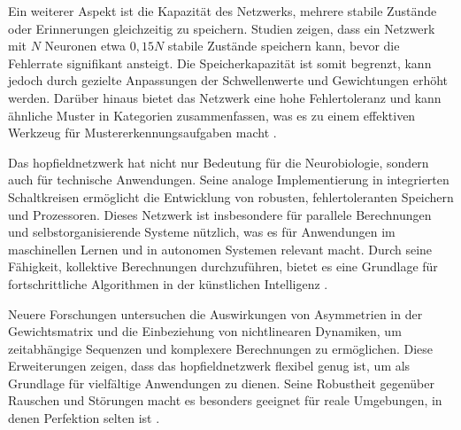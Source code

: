 Ein weiterer Aspekt ist die Kapazität des Netzwerks, mehrere stabile Zustände oder Erinnerungen gleichzeitig zu speichern. Studien zeigen, dass ein Netzwerk mit \(N\) Neuronen etwa \(0,15N\) stabile Zustände speichern kann, bevor die Fehlerrate signifikant ansteigt. Die Speicherkapazität ist somit begrenzt, kann jedoch durch gezielte Anpassungen der Schwellenwerte und Gewichtungen erhöht werden. Darüber hinaus bietet das Netzwerk eine hohe Fehlertoleranz und kann ähnliche Muster in Kategorien zusammenfassen, was es zu einem effektiven Werkzeug für Mustererkennungsaufgaben macht \cite[vgl. S. 2556]{Hopfield1982} \cite[vgl. S. 3091]{Hopfield1984}.

Das \gls{hopfieldnetzwerk} hat nicht nur Bedeutung für die Neurobiologie, sondern auch für technische Anwendungen. Seine analoge Implementierung in integrierten Schaltkreisen ermöglicht die Entwicklung von robusten, fehlertoleranten Speichern und Prozessoren. Dieses Netzwerk ist insbesondere für parallele Berechnungen und selbstorganisierende Systeme nützlich, was es für Anwendungen im maschinellen Lernen und in autonomen Systemen relevant macht. Durch seine Fähigkeit, kollektive Berechnungen durchzuführen, bietet es eine Grundlage für fortschrittliche Algorithmen in der künstlichen Intelligenz \cite[vgl. S. 2554 ff.]{Hopfield1982}.

Neuere Forschungen untersuchen die Auswirkungen von Asymmetrien in der Gewichtsmatrix und die Einbeziehung von nichtlinearen Dynamiken, um zeitabhängige Sequenzen und komplexere Berechnungen zu ermöglichen. Diese Erweiterungen zeigen, dass das \gls{hopfieldnetzwerk} flexibel genug ist, um als Grundlage für vielfältige Anwendungen zu dienen. Seine Robustheit gegenüber Rauschen und Störungen macht es besonders geeignet für reale Umgebungen, in denen Perfektion selten ist \cite[vgl. S. 2557]{Hopfield1982} \cite[vgl. S. 3092]{Hopfield1984}.
